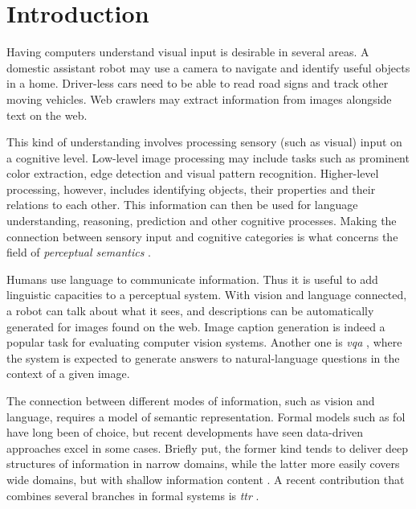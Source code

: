 \glsresetall
\section{Introduction}
\label{sec:intro}

Having computers understand visual input is desirable in several areas.
A domestic assistant robot may use a camera to navigate and identify useful objects in a home.
Driver-less cars need to be able to read road signs and track other moving vehicles.
Web crawlers may extract information from images alongside text on the web.

This kind of understanding involves processing sensory (such as visual) input on a cognitive level.
Low-level image processing may include tasks such as prominent color extraction, edge detection and visual pattern recognition.
Higher-level processing, however, includes identifying objects, their properties and their relations to each other.
This information can then be used for language understanding, reasoning, prediction and other cognitive processes.
Making the connection between sensory input and cognitive categories is what concerns the field of \textit{perceptual semantics} \citep{PustejovskyPerceptualsemanticsconstruction1990}.

Humans use language to communicate information.
Thus it is useful to add linguistic capacities to a perceptual system.
With vision and language connected, a robot can talk about what it sees, and descriptions can be automatically generated for images found on the web.
Image caption generation is indeed a popular task for evaluating computer vision systems.
Another one is \textit{\gls{vqa}} \citep{AgrawalVQAVisualQuestion2015}, where the system is expected to generate answers to natural-language questions in the context of a given image.

The connection between different modes of information, such as vision and language, requires a model of semantic representation.
Formal models such as \gls{fol} have long been of choice, but recent developments have seen data-driven approaches excel in some cases.
Briefly put, the former kind tends to deliver deep structures of information in narrow domains, while the latter more easily covers wide domains, but with shallow information content \citep{Dobnik:2017ag}.
A recent contribution that combines several branches in formal systems is \textit{\gls{ttr}} \citep{CooperAustiniantruthattitudes2005,CooperTypetheorylanguage2016}.

